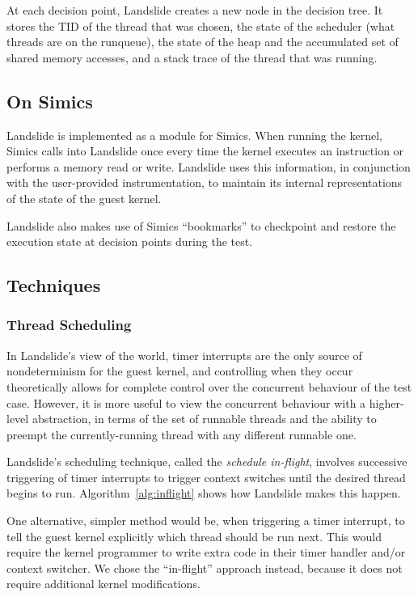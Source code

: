 At each decision point, Landslide creates a new node in the decision tree. It stores the TID of the thread that was chosen, the state of the scheduler (what threads are on the runqueue), the state of the heap and the accumulated set of shared memory accesses, and a stack trace of the thread that was running.

\subsection{On Simics}

Landslide is implemented as a module for Simics\cite{simics}. When running the kernel, Simics calls into Landslide once every time the kernel executes an instruction or performs a memory read or write. Landslide uses this information, in conjunction with the user-provided instrumentation, to maintain its internal representations of the state of the guest kernel.

Landslide also makes use of Simics ``bookmarks'' to checkpoint and restore the execution state at decision points during the test.

\subsection{Techniques}
\subsubsection{Thread Scheduling}

In Landslide's view of the world, timer interrupts are the only source of nondeterminism for the guest kernel, and controlling when they occur theoretically allows for complete control over the concurrent behaviour of the test case. However, it is more useful to view the concurrent behaviour with a higher-level abstraction, in terms of the set of runnable threads and the ability to preempt the currently-running thread with any different runnable one.

Landslide's scheduling technique, called the {\em schedule in-flight}, involves successive triggering of timer interrupts to trigger context switches until the desired thread begins to run. Algorithm~\ref{alg:inflight} shows how Landslide makes this happen.

One alternative, simpler method would be, when triggering a timer interrupt, to tell the guest kernel explicitly which thread should be run next. This would require the kernel programmer to write extra code in their timer handler and/or context switcher. We chose the ``in-flight'' approach instead, because it does not require additional kernel modifications.

